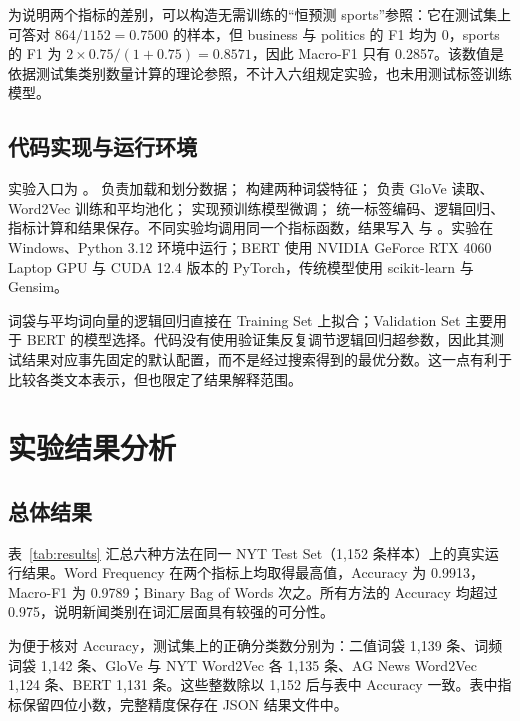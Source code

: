 \documentclass[UTF8,a4paper,10pt]{ctexart}
\begin{document}
为说明两个指标的差别，可以构造无需训练的“恒预测 sports”参照：它在测试集上可答对 $864/1152=0.7500$ 的样本，但 business 与 politics 的 F1 均为 0，sports 的 F1 为 $2\times0.75/(1+0.75)=0.8571$，因此 Macro-F1 只有 0.2857。该数值是依据测试集类别数量计算的理论参照，不计入六组规定实验，也未用测试标签训练模型。

\subsection{代码实现与运行环境}

实验入口为 。 负责加载和划分数据； 构建两种词袋特征； 负责 GloVe 读取、Word2Vec 训练和平均池化； 实现预训练模型微调； 统一标签编码、逻辑回归、指标计算和结果保存。不同实验均调用同一个指标函数，结果写入  与 。实验在 Windows、Python 3.12 环境中运行；BERT 使用 NVIDIA GeForce RTX 4060 Laptop GPU 与 CUDA 12.4 版本的 PyTorch，传统模型使用 scikit-learn 与 Gensim。

词袋与平均词向量的逻辑回归直接在 Training Set 上拟合；Validation Set 主要用于 BERT 的模型选择。代码没有使用验证集反复调节逻辑回归超参数，因此其测试结果对应事先固定的默认配置，而不是经过搜索得到的最优分数。这一点有利于比较各类文本表示，但也限定了结果解释范围。

\section{实验结果分析}

\subsection{总体结果}
\enlargethispage{2\baselineskip}

表~\ref{tab:results} 汇总六种方法在同一 NYT Test Set（1,152 条样本）上的真实运行结果。Word Frequency 在两个指标上均取得最高值，Accuracy 为 0.9913，Macro-F1 为 0.9789；Binary Bag of Words 次之。所有方法的 Accuracy 均超过 0.975，说明新闻类别在词汇层面具有较强的可分性。

为便于核对 Accuracy，测试集上的正确分类数分别为：二值词袋 1,139 条、词频词袋 1,142 条、GloVe 与 NYT Word2Vec 各 1,135 条、AG News Word2Vec 1,124 条、BERT 1,131 条。这些整数除以 1,152 后与表中 Accuracy 一致。表中指标保留四位小数，完整精度保存在 JSON 结果文件中。
\end{document}
